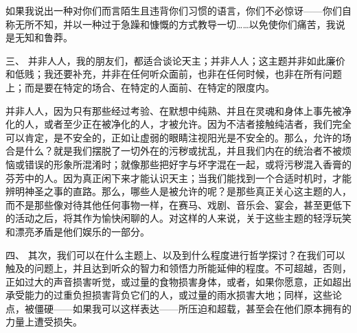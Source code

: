 如果我说出一种对你们而言陌生且违背你们习惯的语言，你们不必惊讶——你们自称无所不知，并以一种过于急躁和慷慨的方式教导一切……以免使你们痛苦，我说是无知和鲁莽。\par

三、 并非人人，我的朋友们，都适合谈论天主；并非人人；这主题并非如此廉价和低贱；我还要补充，并非在任何听众面前，也非在任何时候，也非在所有问题上；而是要在特定的场合、在特定的人面前、在特定的限度内。\par

并非人人，因为只有那些经过考验、在默想中纯熟、并且在灵魂和身体上事先被净化的人，或者至少正在被净化的人，才被允许。因为不洁者接触纯洁者，我们完全可以肯定，是不安全的，正如让虚弱的眼睛注视阳光是不安全的。那么，允许的场合是什么？就是我们摆脱了一切外在的污秽或扰乱，并且我们内在的统治者不被烦恼或错误的形象所混淆时；就像那些把好字与坏字混在一起，或将污秽混入香膏的芬芳中的人。因为真正闲下来才能认识天主；当我们能找到一个合适时机时，才能辨明神圣之事的直路。那么，哪些人是被允许的呢？是那些真正关心这主题的人，而不是那些像对待其他任何事物一样，在赛马、戏剧、音乐会、宴会，甚至更低下的活动之后，将其作为愉快闲聊的人。对这样的人来说，关于这些主题的轻浮玩笑和漂亮矛盾是他们娱乐的一部分。\par

四、 其次，我们可以在什么主题上、以及到什么程度进行哲学探讨？在我们可以触及的问题上，并且达到听众的智力和领悟力所能延伸的程度。不可超越，否则，正如过大的声音损害听觉，或过量的食物损害身体，或者，如果你愿意，正如超出承受能力的过重负担损害背负它们的人，或过量的雨水损害大地；同样，这些论点，被僵硬——如果我可以这样表达——所压迫和超载，甚至会在他们原本拥有的力量上遭受损失。\par

